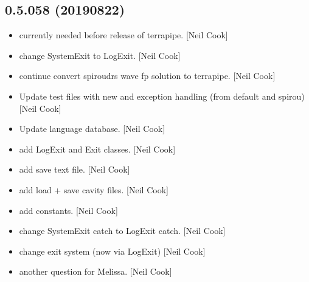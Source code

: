 \documentclass[a4paper,10pt,english]{report}
\begin{document}
\subsection{0.5.058 (2019\sphinxhyphen{}08\sphinxhyphen{}22)}
\label{\detokenize{misc/changelog:id104}}\begin{itemize}
\item {} 
 \sphinxhyphen{} currently needed before release of terrapipe. {[}Neil
Cook{]}

\item {} 
 \sphinxhyphen{} change SystemExit to LogExit.
{[}Neil Cook{]}

\item {} 
 \sphinxhyphen{} continue convert spiroudrs wave fp solution to
terrapipe. {[}Neil Cook{]}

\item {} 
Update test files with new  and exception handling (from
default and spirou) {[}Neil Cook{]}

\item {} 
Update language database. {[}Neil Cook{]}

\item {} 
 \sphinxhyphen{} add LogExit and Exit classes. {[}Neil Cook{]}

\item {} 
 \sphinxhyphen{} add save text file. {[}Neil Cook{]}

\item {} 
 \sphinxhyphen{} add load + save cavity files. {[}Neil Cook{]}

\item {} 
 \sphinxhyphen{} add  constants. {[}Neil Cook{]}

\item {} 
 \sphinxhyphen{} change SystemExit catch to LogExit catch.
{[}Neil Cook{]}

\item {} 
 \sphinxhyphen{} change exit system (now via LogExit) {[}Neil
Cook{]}

\item {} 
 \sphinxhyphen{} another question for Melissa. {[}Neil Cook{]}

\end{itemize}
\end{document}
